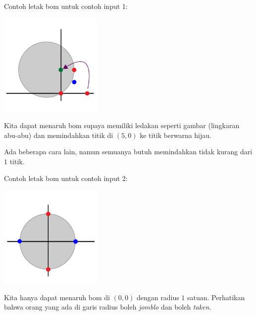 \documentclass{article}
\begin{document}
\par\noindent Contoh letak bom untuk contoh input 1:

\includegraphics[width=5cm]{sample-1}

\par\noindent Kita dapat menaruh bom supaya memiliki ledakan seperti gambar (lingkaran abu-abu) dan memindahkan titik di $(5,0)$ ke titik berwarna hijau.

\par\noindent Ada beberapa cara lain, namun semuanya butuh memindahkan tidak kurang dari $1$ titik.

\par\noindent Contoh letak bom untuk contoh input 2:

\includegraphics[width=5cm]{sample-2}

\par\noindent Kita hanya dapat menaruh bom di $(0,0)$ dengan radius $1$ satuan. Perhatikan bahwa orang yang ada di garis radius boleh \textit{jomblo} dan boleh \textit{taken}.
\end{document}
